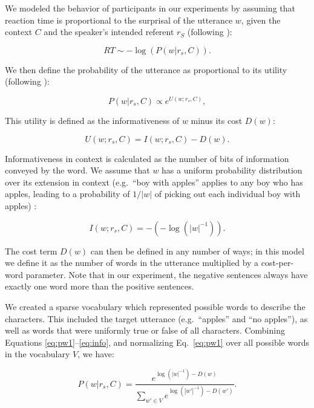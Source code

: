 \documentclass[man]{apa2}
\begin{document}
We modeled the behavior of participants in our experiments by assuming that reaction time is proportional to the surprisal of the utterance $w$, given the context $C$ and the speaker's intended referent $r_S$ (following ):

\begin{equation}\label{eq:model_surprise}
RT \sim -\log(P(w| r_s, C)).
\end{equation}

\noindent We then define the probability of the utterance as proportional to its utility (following ):

\begin{equation}\label{eq:pw1}
P(w | r_s, C) \propto  e^{U(w;r_s,C)},
\end{equation} 

\noindent This utility is defined as the informativeness of $w$ minus its cost $D(w)$:

\begin{equation}\label{eq:utility}
U(w;r_s,C) = I(w;r_s, C) - D(w).
\end{equation}

\noindent Informativeness in context is calculated as the number of bits of information conveyed by the word. We assume that $w$ has a uniform probability distribution over its extension in context (e.g.\ ``boy with apples'' applies to any boy who has apples, leading to a probability of $1/|w|$ of picking out each individual boy with apples) :

\begin{equation}\label{eq:info}
I(w;r_s, C) = -(-\log(|w|^{-1})).
\end{equation}

\noindent The cost term $D(w)$ can then be defined in any number of ways; in this model we define it as the number of words in the utterance multiplied by a cost-per-word parameter.  Note that in our experiment, the negative sentences always have exactly one word more than the positive sentences. 

We created a sparse vocabulary which represented possible words to describe the characters.  This included the target utterance (e.g.\ ``apples'' and ``no apples''), as well as words that were uniformly true or false of all characters. Combining Equations \ref{eq:pw1}--\ref{eq:info}, and normalizing Eq.\ \ref{eq:pw1} over all possible words in the vocabulary $V$, we have:

\begin{equation}\label{eq:pw2}
P(w | r_s, C) = \frac{ e^{\log(|w|^{-1}) - D(w)}} {\sum_{w' \in V}{e^{\log(|w'|^{-1}) - D(w')}}}.
\end{equation}
\end{document}
